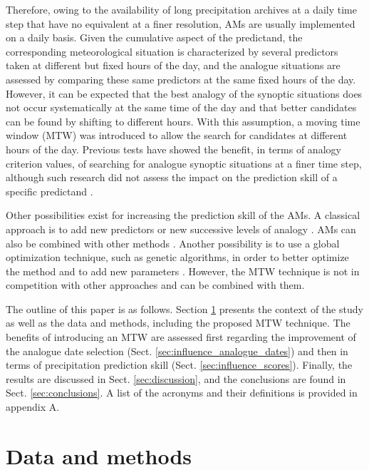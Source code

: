 \documentclass[hess, manuscript]{copernicus}
\begin{document}
	Therefore, owing to the availability of long precipitation archives at a daily time step that have no equivalent at a finer resolution, AMs are usually implemented on a daily basis. Given the cumulative aspect of the predictand, the corresponding meteorological situation is characterized by several predictors taken at different but fixed hours of the day, and the analogue situations are assessed by comparing these same predictors at the same fixed hours of the day. However, it can be expected that the best analogy of the synoptic situations does not occur systematically at the same time of the day and that better candidates can be found by shifting to different hours. With this assumption, a moving time window (MTW) was introduced to allow the search for candidates at different hours of the day. Previous tests have showed the benefit, in terms of analogy criterion values, of searching for analogue synoptic situations at a finer time step, although such research did not assess the impact on the prediction skill of a specific predictand \citep{Finet2008}.
	
	Other possibilities exist for increasing the prediction skill of the AMs. A classical approach is to add new predictors or new successive levels of analogy \citep[e.g.][]{Horton2012a, BenDaoud2016, Caillouet2016}. AMs can also be combined with other methods \citep[e.g.][]{Chardon2017}. Another possibility is to use a global optimization technique, such as genetic algorithms, in order to better optimize the method and to add new parameters \citep{Horton2017}. However, the MTW technique is not in competition with other approaches and can be combined with them.
	
	The outline of this paper is as follows. Section \ref{sec:data_methods} presents the context of the study as well as the data and methods, including the proposed MTW technique. The benefits of introducing an MTW are assessed first regarding the improvement of the analogue date selection (Sect. \ref{sec:influence_analogue_dates}) and then in terms of precipitation prediction skill (Sect. \ref{sec:influence_scores}). Finally, the results are discussed in Sect. \ref{sec:discussion}, and the conclusions are found in Sect. \ref{sec:conclusions}. A list of the acronyms and their definitions is provided in appendix A.
	
	
	\section{Data and methods}
	\label{sec:data_methods}
	
\end{document}
